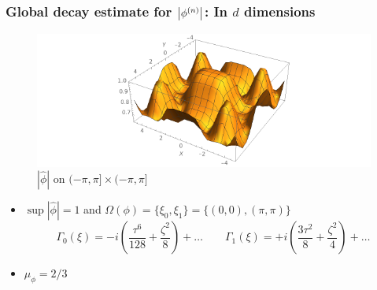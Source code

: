 \documentclass{beamer}
\theoremstyle{definition}
\begin{document}
\begin{frame}
\frametitle{Global decay estimate for $\abs{\phi^{(n)}}$: In $d$ dimensions}

\begin{figure}
\vspace{-10pt}
\centering
\includegraphics[scale=0.4]{d_dim_ex_2}
\caption{$|\widehat{\phi}|$ on $(-\pi, \pi] \times (-\pi, \pi]$}
\end{figure}
\vspace{-10pt}
\begin{itemize}
\item $\sup|\widehat{\phi}| = 1$ and $\Omega(\phi)= \{\xi_0,\xi_1 \}  = \{ (0,0), (\pi,\pi) \} $
\begin{equation*}
\Gamma_{0}(\xi)=-i\left(\frac{\tau^6}{128}+\frac{\zeta^2}{8}\right) + \dots \qquad \Gamma_{1}(\xi)= +i\left(\frac{3\tau^2}{8}+\frac{\zeta^2}{4}\right) + \dots
\end{equation*}

\item $\mu_\phi = 2/3$
\end{itemize}
\end{frame}
\end{document}
